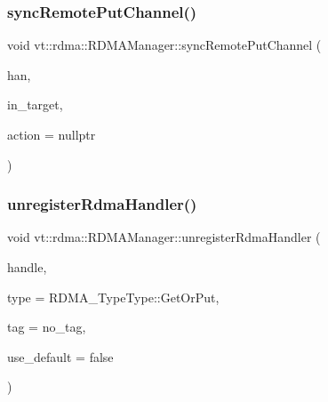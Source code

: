 \mbox{\label{structvt_1_1rdma_1_1_r_d_m_a_manager_aae382995709cd7827f256f9d5f3e45e4}} 
\subsubsection{\texorpdfstring{sync\+Remote\+Put\+Channel()}{syncRemotePutChannel()}\hspace{0.1cm}{\footnotesize\ttfamily [2/2]}}
{\footnotesize\ttfamily void vt\+::rdma\+::\+R\+D\+M\+A\+Manager\+::sync\+Remote\+Put\+Channel (\begin{DoxyParamCaption}\item[{\hyperlink{namespacevt_a10442579ec4e7ebef223818e64bcf908}{R\+D\+M\+A\+\_\+\+Handle\+Type} const \&}]{han,  }\item[{\hyperlink{namespacevt_a866da9d0efc19c0a1ce79e9e492f47e2}{Node\+Type} const \&}]{in\+\_\+target,  }\item[{\hyperlink{namespacevt_ae0a5a7b18cc99d7b732cb4d44f46b0f3}{Action\+Type} const \&}]{action = {\ttfamily nullptr} }\end{DoxyParamCaption})\hspace{0.3cm}{\ttfamily [inline]}}

\mbox{\label{structvt_1_1rdma_1_1_r_d_m_a_manager_a59de11a7b7a8034a2e8e27a10897ce01}} 
\subsubsection{\texorpdfstring{unregister\+Rdma\+Handler()}{unregisterRdmaHandler()}\hspace{0.1cm}{\footnotesize\ttfamily [1/2]}}
{\footnotesize\ttfamily void vt\+::rdma\+::\+R\+D\+M\+A\+Manager\+::unregister\+Rdma\+Handler (\begin{DoxyParamCaption}\item[{\hyperlink{namespacevt_a10442579ec4e7ebef223818e64bcf908}{R\+D\+M\+A\+\_\+\+Handle\+Type} const \&}]{handle,  }\item[{\hyperlink{namespacevt_1_1rdma_ac848e1d9da43db6294bd06f83e5d3946}{R\+D\+M\+A\+\_\+\+Type\+Type} const \&}]{type = {\ttfamily RDMA\+\_\+TypeType\+:\+:GetOrPut},  }\item[{\hyperlink{namespacevt_a84ab281dae04a52a4b243d6bf62d0e52}{Tag\+Type} const \&}]{tag = {\ttfamily no\+\_\+tag},  }\item[{bool const \&}]{use\+\_\+default = {\ttfamily false} }\end{DoxyParamCaption})}

